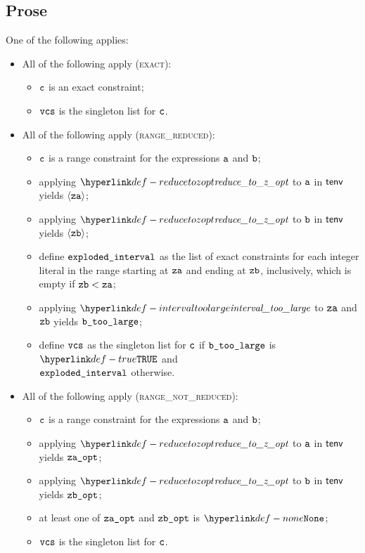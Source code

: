 \subsection{Prose}
One of the following applies:
\begin{itemize}
  \item All of the following apply (\textsc{exact}):
  \begin{itemize}
    \item $\texttt{c}$ is an exact constraint;
    \item $\texttt{vcs}$ is the singleton list for $\texttt{c}$.
  \end{itemize}

  \item All of the following apply (\textsc{range\_reduced}):
  \begin{itemize}
    \item $\texttt{c}$ is a range constraint for the expressions $\texttt{a}$ and $\texttt{b}$;
    \item applying $\reducetozopt$ to $\texttt{a}$ in $\textsf{tenv}$ yields $\langle\texttt{za}\rangle$;
    \item applying $\reducetozopt$ to $\texttt{b}$ in $\textsf{tenv}$ yields $\langle\texttt{zb}\rangle$;
    \item define $\texttt{exploded\_interval}$ as the list of exact constraints for each integer literal in the range starting
          at $\texttt{za}$ and ending at $\texttt{zb}$, inclusively, which is empty if $\texttt{zb} < \texttt{za}$;
    \item applying $\intervaltoolarge$ to $\texttt{za}$ and $\texttt{zb}$ yields $\texttt{b\_too\_large}$;
    \item define $\texttt{vcs}$ as the singleton list for $\texttt{c}$ if $\texttt{b\_too\_large}$ is $\True$ and \\
          $\texttt{exploded\_interval}$ otherwise.
  \end{itemize}

  \item All of the following apply (\textsc{range\_not\_reduced}):
  \begin{itemize}
    \item $\texttt{c}$ is a range constraint for the expressions $\texttt{a}$ and $\texttt{b}$;
    \item applying $\reducetozopt$ to $\texttt{a}$ in $\textsf{tenv}$ yields $\texttt{za\_opt}$;
    \item applying $\reducetozopt$ to $\texttt{b}$ in $\textsf{tenv}$ yields $\texttt{zb\_opt}$;
    \item at least one of $\texttt{za\_opt}$ and $\texttt{zb\_opt}$ is $\None$;
    \item $\texttt{vcs}$ is the singleton list for $\texttt{c}$.
  \end{itemize}
\end{itemize}

